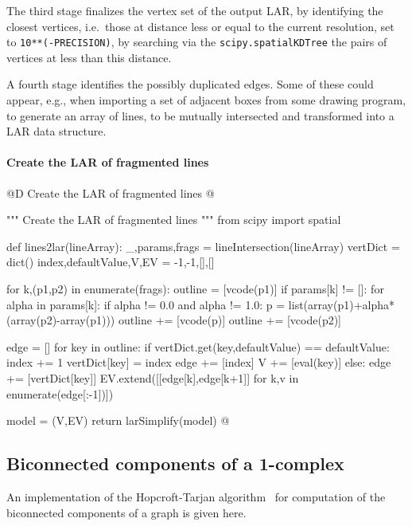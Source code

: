 \documentclass[11pt,oneside]{article}    %
\begin{document}
The third stage finalizes the vertex set of the output LAR, by identifying the closest vertices, i.e.~those at distance
less or equal to the current resolution, set to \texttt{10**(-PRECISION)}, by searching via the \texttt{scipy.spatialKDTree} the pairs of vertices at less than this distance.

A fourth stage identifies the possibly duplicated edges. Some of these could appear, e.g., when importing a set of adjacent boxes from some drawing program, to generate an array of lines, to be mutually intersected and transformed into a LAR data structure.

\paragraph{Create the LAR of fragmented lines}
@D Create the LAR of fragmented lines
@{""" Create the LAR of fragmented lines """
from scipy import spatial

def lines2lar(lineArray):
    _,params,frags = lineIntersection(lineArray)
    vertDict = dict()
    index,defaultValue,V,EV = -1,-1,[],[]
    
    for k,(p1,p2) in enumerate(frags):
        outline = [vcode(p1)]
        if params[k] != []:
            for alpha in params[k]:
                if alpha != 0.0 and alpha != 1.0:
                    p = list(array(p1)+alpha*(array(p2)-array(p1)))
                    outline += [vcode(p)]
        outline += [vcode(p2)]
    
        edge = []
        for key in outline:
            if vertDict.get(key,defaultValue) == defaultValue:
                index += 1
                vertDict[key] = index
                edge += [index]
                V += [eval(key)]
            else:
                edge += [vertDict[key]]
            EV.extend([[edge[k],edge[k+1]] for k,v in enumerate(edge[:-1])])
    
    model = (V,EV)
    return larSimplify(model)
@}



\subsection{Biconnected components of a 1-complex}

An implementation of the Hopcroft-Tarjan algorithm~\cite{Hopcroft:1973:AEA:362248.362272} for computation of the biconnected components of a graph is given here.
\end{document}
